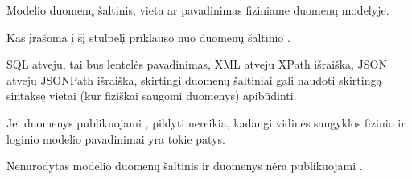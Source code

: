 \documentclass[letterpaper,10pt,lithuanian]{sphinxmanual}
\begin{document}

\begin{fulllineitems}
\label{\detokenize{dimensijos:model.source}}
\pysigstartsignatures
{}
\pysigstopsignatures
\sphinxAtStartPar
Modelio duomenų šaltinis, vieta ar pavadinimas fiziniame duomenų modelyje.

\sphinxAtStartPar
Kas įrašoma į šį stulpelį priklauso nuo duomenų šaltinio {\hyperref[\detokenize{dimensijos:resource.type}]{}}.

\sphinxAtStartPar
SQL atveju, tai bus lentelės pavadinimas, XML atveju \sphinxhyphen{} XPath išraiška, JSON
atveju \sphinxhyphen{} JSONPath išraiška, skirtingi duomenų šaltiniai gali naudoti
skirtingą sintaksę vietai (kur fiziškai saugomi duomenys) apibūdinti.

\sphinxAtStartPar
Jei duomenys publikuojami ,
{\hyperref[\detokenize{dimensijos:model.source}]{}} pildyti nereikia, kadangi vidinės saugyklos fizinio ir
loginio modelio pavadinimai yra tokie patys.

\begin{sphinxShadowBox}
\begin{description}
\sphinxAtStartPar
Nenurodytas modelio duomenų šaltinis {\hyperref[\detokenize{dimensijos:model.source}]{}} ir duomenys nėra
publikuojami .

\end{description}
\end{sphinxShadowBox}

\end{fulllineitems}

\end{document}

